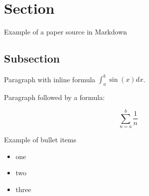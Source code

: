 \hypertarget{section}{%
\section{Section}\label{section}}

Example of a paper source in Markdown

\hypertarget{subsection}{%
\subsection{Subsection}\label{subsection}}

Paragraph with inline formula \(\int _a ^b \sin(x) dx\).

Paragraph followed by a formula:

\[\sum _{n=a} ^ b \frac{1}{n}\]

Example of bullet items

\begin{itemize}
\tightlist
\item
  one
\item
  two
\item
  three
\end{itemize}
